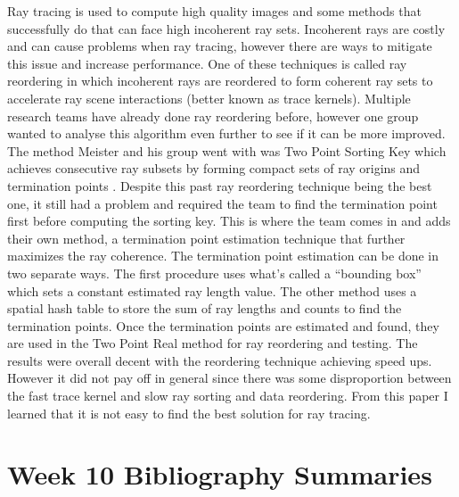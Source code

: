 \documentclass{article}
\begin{document}
Ray tracing is used to compute high quality images and some methods that successfully do that can face high incoherent ray sets. Incoherent rays are costly and can cause problems when ray tracing, however there are ways to mitigate this issue and increase performance. One of these techniques is called ray reordering in which incoherent rays are reordered to form coherent ray sets to accelerate ray scene interactions (better known as trace kernels). Multiple research teams have already done ray reordering before, however one group wanted to analyse this algorithm even further to see if it can be more improved. The method Meister and his group went with was Two Point Sorting Key which achieves consecutive ray subsets by forming compact sets of ray origins and termination points \cite{10.1145/3384382.3384534}. Despite this past ray reordering technique being the best one, it still had a problem and required the team to find the termination point first before computing the sorting key. This is where the team comes in and adds their own method, a termination point estimation technique that further maximizes the ray coherence. The termination point estimation can be done in two separate ways. The first procedure uses what's called a “bounding box” which sets a constant estimated ray length value. The other method uses a spatial hash table to store the sum of ray lengths and counts to find the termination points. Once the termination points are estimated and found, they are used in the Two Point Real method for ray reordering and testing. The results were overall decent with the reordering technique achieving speed ups. However it did not pay off in general since there was some disproportion between the fast trace kernel and slow ray sorting and data reordering. From this paper I learned that it is not easy to find the best solution for ray tracing.      

\section{Week 10 Bibliography Summaries}
\end{document}
